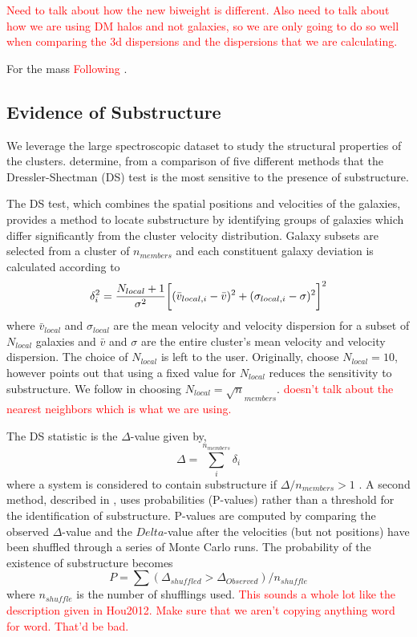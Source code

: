 \documentclass[apj, revtex4]{emulateapj}
\newcommand{\editorial}[1]{\textcolor{red}{#1} }
\begin{document}
\editorial{Need to talk about how the new biweight is different. Also need to talk about how we are using DM halos and not galaxies, so we are only going to do so well when comparing the 3d dispersions and the dispersions that we are calculating.}

For the mass \editorial{Following \cite{Evrard2008, VanderBurg2014, Sifon2013}}.

\subsection{Evidence of Substructure}
We leverage the large spectroscopic dataset to study the structural properties of the clusters. \cite{Pinkney1996} determine, from a comparison of five different methods that the Dressler-Shectman (DS) test \citep{Dressler1988} is the most sensitive to the presence of substructure.

The DS test, which combines the spatial positions and velocities of the galaxies, provides a method to locate substructure by identifying groups of galaxies which differ significantly from the cluster velocity distribution. Galaxy subsets are selected from a cluster of $n_{members}$ and each constituent galaxy deviation is calculated according to
\begin{equation}
	\delta_i^2 = \frac{N_{local}+1}{\sigma^2}\bigg{[}(\bar{v}_{local,i} - \bar{v})^2 + (\sigma_{local,i} - \sigma)^2\bigg{]}^2
\end{equation}
where $\bar{v}_{local}$ and $\sigma_{local}$ are the mean velocity and velocity dispersion for a subset of $N_{local}$ galaxies and $\bar{v}$ and $\sigma$ are the entire cluster's mean velocity and velocity dispersion. The choice of $N_{local}$ is left to the user. Originally, \cite{Dressler1988} choose $N_{local}=10$, however \cite{Bird1994} points out that using a fixed value for $N_{local}$ reduces the sensitivity to substructure. We follow \cite{Bird1994} in choosing $N_{local} = \sqrt n_{members}$. \editorial{doesn't talk about the nearest neighbors which is what we are using.}

The DS statistic is the $\Delta$-value given by, 
\begin{equation}
	\Delta = \sum^{n_{members}}_i \delta_i
\end{equation}
where a system is considered to contain substructure if $\Delta/n_{members} > 1$ \citep{Dressler1988}. A second method, described in \cite{Hou2012}, uses probabilities (P-values) rather than a threshold for the identification of substructure. P-values are computed by comparing the observed $\Delta$-value and the $Delta$-value after the velocities (but not positions) have been shuffled through a series of Monte Carlo runs. The probability of the existence of substructure becomes
\begin{equation}
	P = \sum (\Delta_{shuffled} > \Delta_{Observed}) / n_{shuffle}
\end{equation}
where $n_{shuffle}$ is the number of shufflings used. \editorial{This sounds a whole lot like the description given in Hou2012. Make sure that we aren't copying anything word for word. That'd be bad.}
\end{document}
